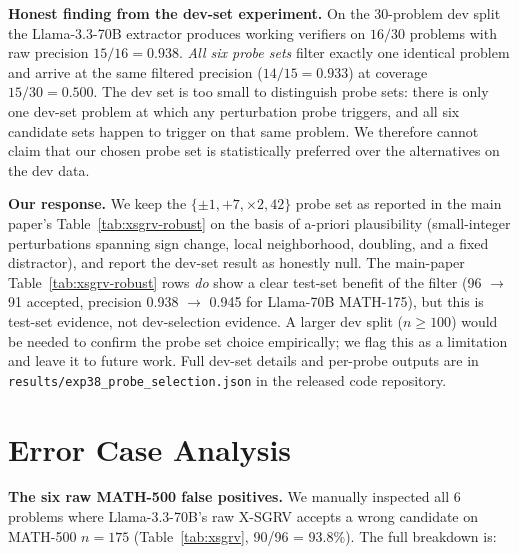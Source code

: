\documentclass{article}
\begin{document}
\textbf{Honest finding from the dev-set experiment.} On the 30-problem dev split the Llama-3.3-70B extractor produces working verifiers on $16/30$ problems with raw precision $15/16 = 0.938$. \emph{All six probe sets} filter exactly one identical problem and arrive at the same filtered precision ($14/15 = 0.933$) at coverage $15/30 = 0.500$. The dev set is too small to distinguish probe sets: there is only one dev-set problem at which any perturbation probe triggers, and all six candidate sets happen to trigger on that same problem. We therefore cannot claim that our chosen probe set is statistically preferred over the alternatives on the dev data.

\textbf{Our response.} We keep the $\{\pm 1, +7, \times 2, 42\}$ probe set as reported in the main paper's Table~\ref{tab:xsgrv-robust} on the basis of a-priori plausibility (small-integer perturbations spanning sign change, local neighborhood, doubling, and a fixed distractor), and report the dev-set result as honestly null. The main-paper Table~\ref{tab:xsgrv-robust} rows \emph{do} show a clear test-set benefit of the filter (96 $\to$ 91 accepted, precision 0.938 $\to$ 0.945 for Llama-70B MATH-175), but this is test-set evidence, not dev-selection evidence. A larger dev split ($n \ge 100$) would be needed to confirm the probe set choice empirically; we flag this as a limitation and leave it to future work. Full dev-set details and per-probe outputs are in \texttt{results/exp38\_probe\_selection.json} in the released code repository.

\section{Error Case Analysis}
\label{app:errors}

\textbf{The six raw MATH-500 false positives.} We manually inspected all 6 problems where Llama-3.3-70B's raw X-SGRV accepts a wrong candidate on MATH-500 $n{=}175$ (Table~\ref{tab:xsgrv}, 90/96 = 93.8\%). The full breakdown is:
\end{document}
